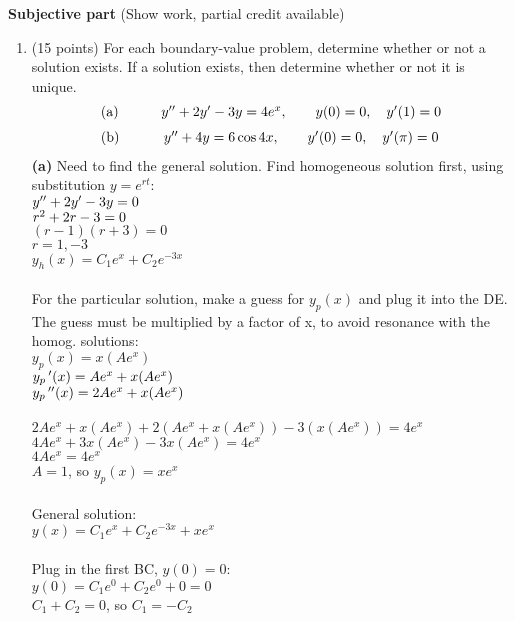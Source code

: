 \documentclass{article}
\begin{document}
\newpage\noindent
{\bf Subjective part} (Show work, partial credit available)

\begin{enumerate}

\item (15 points)  For each boundary-value problem, determine whether or not a solution exists.  If a solution exists, then determine whether or not it is unique.
\[
\begin{array}{lc}
\hbox{(a)}\qquad & y\sp{\prime\prime}+2y\sp\prime-3y=4e\sp{x},\qquad y(0)=0,\quad y\sp\prime(1)=0 \medskip\\

\hbox{(b)}\qquad & y\sp{\prime\prime}+4y=6\cos4x,\qquad y\sp\prime(0)=0,\quad y\sp\prime(\pi)=0
\end{array}
\]
\textbf{(a)} Need to find the general solution. Find homogeneous solution first, using substitution $y=e^{rt}$:\\
$y\sp{\prime\prime}+2y\sp\prime-3y=0 $\\
$r\sp{2} + 2r -3=0$\\
$(r-1)(r+3)=0$\\
$r = 1, -3$\\
$y_h(x) = C_1e^{x} + C_2e^{-3x}$\\\\
For the particular solution, make a guess for $y_p(x)$ and plug it into the DE. The guess must be multiplied by a factor of x, to avoid resonance with the homog. solutions:\\
$y_p(x) = x(Ae^x)$\\
$y_p\,\sp{\prime}(x) = Ae^x + x(Ae^x)$\\
$y_p\,\sp{\prime\prime}(x) = 2Ae^x + x(Ae^x)$\\\\
$2Ae^x + x(Ae^x) + 2(Ae^x + x(Ae^x)) - 3(x(Ae^x))= 4e^x$\\
$4Ae^x + 3x(Ae^x) - 3x(Ae^x)= 4e^x$\\
$4Ae^x = 4e^x$\\
$A=1$, so $y_p(x) = xe^x$\\\\
General solution:\\
$y(x) = C_1e^{x} + C_2e^{-3x} + xe^x$\\\\
Plug in the first BC, $y(0)=0$:\\
$y(0) = C_1e^{0} + C_2e^{0} + 0 = 0$\\
$C_1 + C_2= 0$, so $C_1 = -C_2$\\\\

\end{enumerate}
\end{document}
